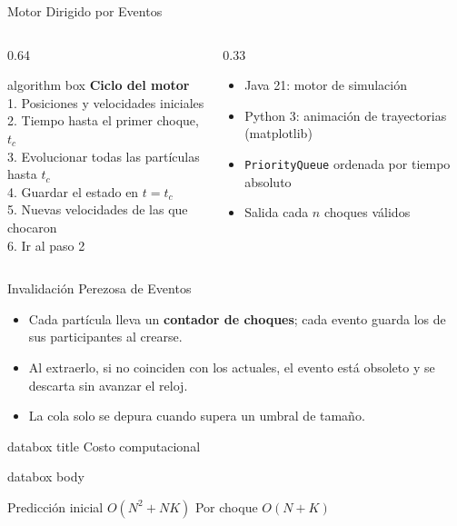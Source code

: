 \documentclass[aspectratio=43,11pt]{beamer}
\newenvironment{databox}[1]{%
  \begin{beamercolorbox}[wd=\linewidth,sep=1mm,center]{databox title}%
    #1
  \end{beamercolorbox}%
  \par\nointerlineskip
  \begin{beamercolorbox}[wd=\linewidth,sep=2mm]{databox body}%
}{%
  \end{beamercolorbox}%
}
\begin{document}
\begin{frame}{Motor Dirigido por Eventos}
  \small
  \begin{columns}[T,onlytextwidth]
    \begin{column}{0.64\textwidth}
      \begin{beamercolorbox}[wd=\linewidth,sep=1.5mm]{algorithm box}
        \textbf{Ciclo del motor}\\[1mm]
        1. Posiciones y velocidades iniciales\\
        2. Tiempo hasta el primer choque, $t_c$\\
        3. Evolucionar todas las partículas hasta $t_c$\\
        4. Guardar el estado en $t = t_c$\\
        5. Nuevas velocidades de las que chocaron\\
        6. Ir al paso 2
      \end{beamercolorbox}
    \end{column}
    \begin{column}{0.33\textwidth}
      \begin{itemize}[label=\textcolor{TPBlue}{$\bullet$}]
        \item Java 21: motor de simulación
        \item Python 3: animación de trayectorias (matplotlib)
        \item \texttt{PriorityQueue} ordenada por tiempo absoluto
        \item Salida cada $n$ choques válidos
      \end{itemize}
    \end{column}
  \end{columns}
\end{frame}

\begin{frame}{Invalidación Perezosa de Eventos}
  \small
  \begin{itemize}
    \item Cada partícula lleva un \textbf{contador de choques}; cada evento
      guarda los de sus participantes al crearse.
    \item Al extraerlo, si no coinciden con los actuales, el evento está
      obsoleto y se descarta sin avanzar el reloj.
    \item La cola solo se depura cuando supera un umbral de tamaño.
  \end{itemize}
  \vspace{0.2cm}
  \begin{databox}{Costo computacional}
    \centering
    Predicción inicial $O(N^2 + NK)$ \hfill Por choque $O(N + K)$
  \end{databox}
\end{frame}
\end{document}
